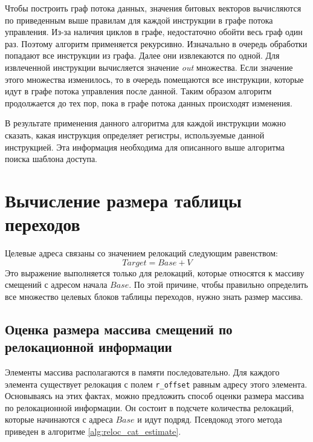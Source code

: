 \documentclass{mipt-thesis-bs}
\begin{document}
    Чтобы построить граф потока данных, значения битовых векторов вычисляются по приведенным выше правилам для каждой инструкции в графе потока управления. Из-за наличия циклов в графе, недостаточно обойти весь граф один раз. Поэтому алгоритм применяется рекурсивно. Изначально в очередь обработки попадают все инструкции из графа. Далее они извлекаются по одной. Для извлеченной инструкции вычисляется значение \textit{out} множества. Если значение этого множества изменилось, то в очередь помещаются все инструкции, которые идут в графе потока управления после данной. Таким образом алгоритм продолжается до тех пор, пока в графе потока данных происходят изменения.


    В результате применения данного алгоритма для каждой инструкции можно сказать, какая инструкция определяет регистры, используемые данной инструкцией. Эта информация необходима для описанного выше алгоритма поиска шаблона доступа.

    \section{Вычисление размера таблицы переходов}
    Целевые адреса связаны со значением релокаций следующим равенством:
    $$Target = Base + V$$
    Это выражение выполняется только для релокаций, которые относятся к массиву смещений с адресом начала $Base$. По этой причине, чтобы правильно определить все множество целевых блоков таблицы переходов, нужно знать размер массива.

    \subsection{Оценка размера массива смещений по релокационной информации} \label{sec:reloc_estimate}

    Элементы массива располагаются в памяти последовательно. Для каждого элемента существует релокация с полем \verb|r_offset| равным адресу этого элемента. Основываясь на этих фактах, можно предложить способ оценки размера массива по релокационной информации. Он состоит в подсчете количества релокаций, которые начинаются с адреса $Base$ и идут подряд. Псевдокод этого метода приведен в алгоритме \ref{alg:reloc_cat_estimate}.
\end{document}
